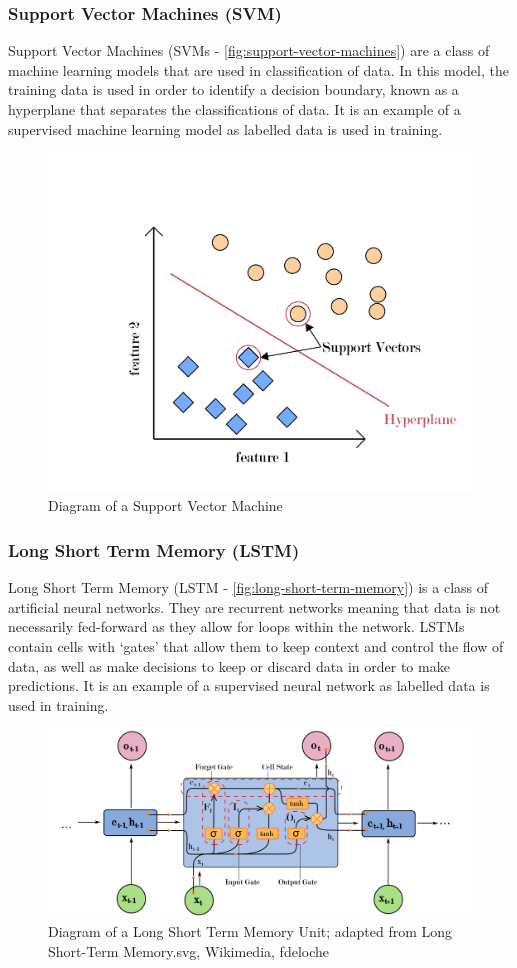 \subsubsection{Support Vector Machines (SVM)}
Support Vector Machines (SVMs - \autoref{fig:support-vector-machines}) are a class of machine learning models that are used in classification
of data. In this model, the training data is used in order to identify a decision boundary, known as
a hyperplane that separates the classifications of data. It is an example of a supervised machine
learning model as labelled data is used in training.
\begin{figure}[hbt!]
    \centering
    \includegraphics[width=0.6\columnwidth]{figures/support-vector-machines.pdf}
    \caption[Diagram of a Support Vector Machine]{Diagram of a Support Vector Machine}
    \label{fig:support-vector-machines}
\end{figure}
\FloatBarrier

\subsubsection{Long Short Term Memory (LSTM)}
Long Short Term Memory (LSTM - \autoref{fig:long-short-term-memory}) is a class of artificial neural networks. They are recurrent
networks meaning that data is not necessarily fed-forward as they allow for loops within the
network. LSTMs contain cells with `gates' that allow them to keep context and control the flow of data,
as well as make decisions to keep or discard data in order to make predictions. It is an example of a supervised neural network as labelled data is used in training.

\begin{figure}[hbt!]
    \centering
    \includegraphics[width=\columnwidth]{figures/long-short-term-memory.pdf}
    \caption[Diagram of a LSTM Unit]{Diagram of a Long Short Term Memory Unit; adapted from Long Short-Term Memory.svg, Wikimedia, fdeloche}
    \label{fig:long-short-term-memory}
\end{figure}
\FloatBarrier

